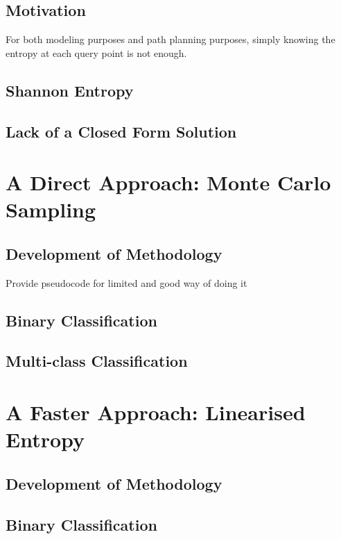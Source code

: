 		\subsection{Motivation}
			For both modeling purposes and path planning purposes, simply knowing the entropy at each query point is not enough. 
			
		\subsection{Shannon Entropy}
		
		\subsection{Lack of a Closed Form Solution}
		
	\section{A Direct Approach: Monte Carlo Sampling}
		
		\subsection{Development of Methodology}
		
			Provide pseudocode for limited and good way of doing it
			
		\subsection{Binary Classification}
		
		\subsection{Multi-class Classification}
		
	\section{A Faster Approach: Linearised Entropy}
		
		\subsection{Development of Methodology}
		
		\subsection{Binary Classification}
		
